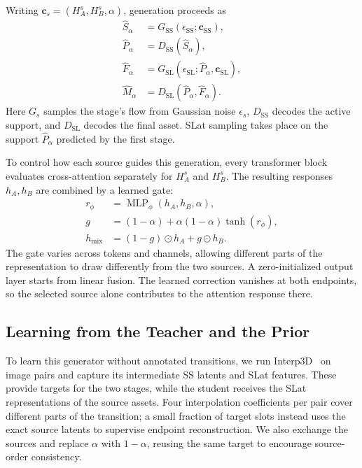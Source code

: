 Writing $\mathbf c_s=(H_A^s,H_B^s,\alpha)$, generation proceeds as
\begin{equation}
\begin{aligned}
\widehat S_\alpha
  &=G_{\mathrm{SS}}(\epsilon_{\mathrm{SS}};\mathbf c_{\mathrm{SS}}),\\
\widehat P_\alpha
  &=D_{\mathrm{SS}}(\widehat S_\alpha),\\
\widehat F_\alpha
  &=G_{\mathrm{SL}}(\epsilon_{\mathrm{SL}};
                   \widehat P_\alpha,\mathbf c_{\mathrm{SL}}),\\
\widehat M_\alpha
  &=D_{\mathrm{SL}}(\widehat P_\alpha,\widehat F_\alpha).
\end{aligned}
\label{eq:method_pipeline}
\end{equation}
Here $G_s$ samples the stage's flow from Gaussian noise $\epsilon_s$,
$D_{\mathrm{SS}}$ decodes the active support, and $D_{\mathrm{SL}}$ decodes
the final asset. SLat sampling takes place on the support $\widehat P_\alpha$
predicted by the first stage.

To control how each source guides this generation, every transformer block
evaluates cross-attention separately for $H_A^s$ and $H_B^s$.
The resulting responses $h_A,h_B$ are combined by a learned gate:
\begin{equation}
\begin{aligned}
r_\phi&=\operatorname{MLP}_\phi(h_A,h_B,\alpha),\\
g&=(1-\alpha)+\alpha(1-\alpha)\tanh(r_\phi),\\
h_{\mathrm{mix}}&=(1-g)\odot h_A+g\odot h_B.
\end{aligned}
\label{eq:method_gate}
\end{equation}
The gate varies across tokens and channels, allowing different parts of
the representation to draw differently from the two sources.
A zero-initialized output layer starts from linear fusion.
The learned correction vanishes at both endpoints, so the selected source
alone contributes to the attention response there.

\subsection{Learning from the Teacher and the Prior}
\label{sec:synthetic_training}

To learn this generator without annotated transitions, we run
Interp3D~\cite{liu2026interp3d} on image pairs and capture
its intermediate SS latents and SLat features. These provide targets for the two stages, while the
student receives the SLat representations of the source assets.
Four interpolation coefficients per pair cover different parts of the
transition; a small fraction of target slots instead uses the exact source
latents to supervise endpoint reconstruction.
We also exchange the sources and replace $\alpha$ with $1-\alpha$, reusing
the same target to encourage source-order consistency.

